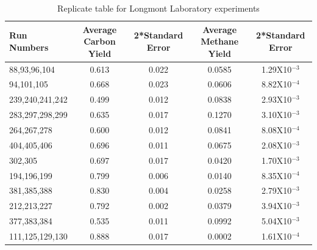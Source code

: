 \documentclass[11pt,twocolumn]{article}
\begin{document}
\begin{table}
\centering
\begin{tabular}{l c c c c}
Run Numbers &	Average Carbon Yield	&	2*Standard Error	&	Average Methane Yield	&	2*Standard Error	\\
\hline
88,93,96,104 &	0.613	& 0.022	&	0.0585	&	1.29X10$^{-3}$ \\
94,101,105	&	0.668	&	0.023	&	0.0606	&	8.82X10$^{-4}$ \\
239,240,241,242&	0.499	&	0.012	&	0.0838	&	2.93X10$^{-3}$ \\
283,297,298,299&	0.635	&	0.017	&	0.1270	&	3.10X10$^{-3}$ \\
264,267,278&		0.600	&	0.012	&	0.0841	&	8.08X10$^{-4}$ \\
404,405,406&		0.696	&	0.011	&	0.0675	& 	2.08X10$^{-3}$ \\
302,305&			0.697	&	0.017	&	0.0420	&	1.70X10$^{-3}$ \\
194,196,199&		0.799	&	0.006	&	0.0140	&	8.35X10$^{-4}$ \\
381,385,388&		0.830	&	0.004	&	0.0258	&	2.79X10$^{-3}$ \\
212,213,227&		0.792	&	0.002	&	0.0379	&	3.94X10$^{-3}$ \\
377,383,384&		0.535	&	0.011	&	0.0992	&	5.04X10$^{-3}$ \\
111,125,129,130&	0.888	&	0.017	&	0.0002	&	1.61X10$^{-4}$ \\
\end{tabular}
\caption{Replicate table for Longmont Laboratory experiments}
\label{tab-replication_analysis}

\end{table}
\end{document}
